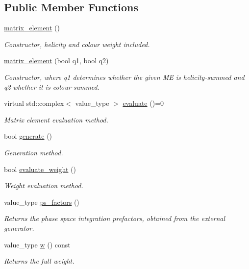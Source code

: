 \subsection*{Public Member Functions}
\begin{DoxyCompactItemize}
\item 
\hypertarget{a00359_a0bbaec502f07f2c2e2e86cc8db1f57a7}{\hyperlink{a00359_a0bbaec502f07f2c2e2e86cc8db1f57a7}{matrix\-\_\-element} ()}\label{a00359_a0bbaec502f07f2c2e2e86cc8db1f57a7}

\begin{DoxyCompactList}\small\item\em Constructor, helicity and colour weight included. \end{DoxyCompactList}\item 
\hyperlink{a00359_a27e710a7f1c07b29a465102b259f7021}{matrix\-\_\-element} (bool q1, bool q2)
\begin{DoxyCompactList}\small\item\em Constructor, where q1 determines whether the given M\-E is helicity-\/summed and q2 whether it is colour-\/summed. \end{DoxyCompactList}\item 
virtual std\-::complex$<$ value\-\_\-type $>$ \hyperlink{a00359_a6d74e7516a6086eb812e0cebc1814641}{evaluate} ()=0
\begin{DoxyCompactList}\small\item\em Matrix element evaluation method. \end{DoxyCompactList}\item 
bool \hyperlink{a00359_a2752785ce5787d0fd58247b5e6a838c0}{generate} ()
\begin{DoxyCompactList}\small\item\em Generation method. \end{DoxyCompactList}\item 
bool \hyperlink{a00359_a0b2e85c881c6721466ad08637f1869a4}{evaluate\-\_\-weight} ()
\begin{DoxyCompactList}\small\item\em Weight evaluation method. \end{DoxyCompactList}\item 
value\-\_\-type \hyperlink{a00359_a023f7b74630c5b84336e4d797af4bf72}{ps\-\_\-factors} ()
\begin{DoxyCompactList}\small\item\em Returns the phase space integration prefactors, obtained from the external generator. \end{DoxyCompactList}\item 
\hypertarget{a00359_a7c38475fbfc849c20eeba3dee6a61db2}{value\-\_\-type \hyperlink{a00359_a7c38475fbfc849c20eeba3dee6a61db2}{w} () const }\label{a00359_a7c38475fbfc849c20eeba3dee6a61db2}

\begin{DoxyCompactList}\small\item\em Returns the full weight. \end{DoxyCompactList}\end{DoxyCompactItemize}
